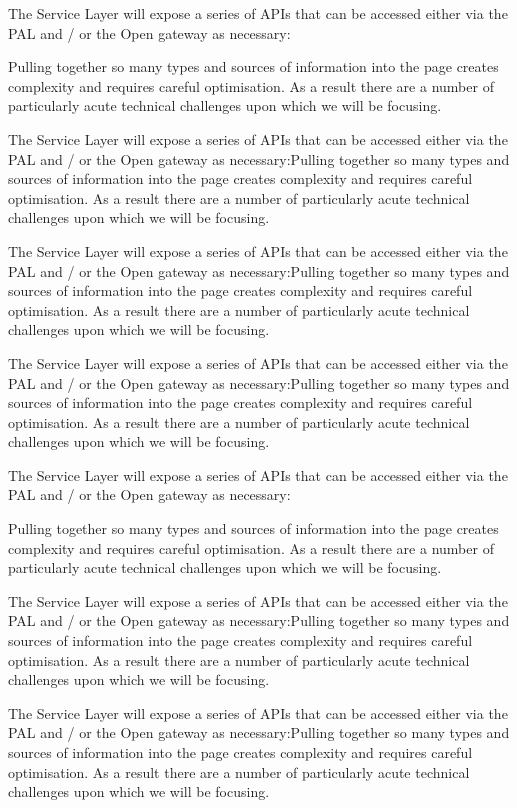 \documentclass[10pt, a4paper, parskip=half,
               enlargefirstpage ]{scrlttr2}
\begin{document}
The Service Layer will expose a series of APIs that can be accessed either via the PAL and / or the Open gateway as necessary:

Pulling together so many types and sources of information into the page creates complexity and requires careful optimisation. As a result there are a number of particularly acute technical challenges upon which we will be focusing.

The Service Layer will expose a series of APIs that can be accessed either via the PAL and / or the Open gateway as necessary:Pulling together so many types and sources of information into the page creates complexity and requires careful optimisation. As a result there are a number of particularly acute technical challenges upon which we will be focusing.

The Service Layer will expose a series of APIs that can be accessed either via the PAL and / or the Open gateway as necessary:Pulling together so many types and sources of information into the page creates complexity and requires careful optimisation. As a result there are a number of particularly acute technical challenges upon which we will be focusing.

The Service Layer will expose a series of APIs that can be accessed either via the PAL and / or the Open gateway as necessary:Pulling together so many types and sources of information into the page creates complexity and requires careful optimisation. As a result there are a number of particularly acute technical challenges upon which we will be focusing.

The Service Layer will expose a series of APIs that can be accessed either via the PAL and / or the Open gateway as necessary:

Pulling together so many types and sources of information into the page creates complexity and requires careful optimisation. As a result there are a number of particularly acute technical challenges upon which we will be focusing.

The Service Layer will expose a series of APIs that can be accessed either via the PAL and / or the Open gateway as necessary:Pulling together so many types and sources of information into the page creates complexity and requires careful optimisation. As a result there are a number of particularly acute technical challenges upon which we will be focusing.

The Service Layer will expose a series of APIs that can be accessed either via the PAL and / or the Open gateway as necessary:Pulling together so many types and sources of information into the page creates complexity and requires careful optimisation. As a result there are a number of particularly acute technical challenges upon which we will be focusing.
\end{document}
